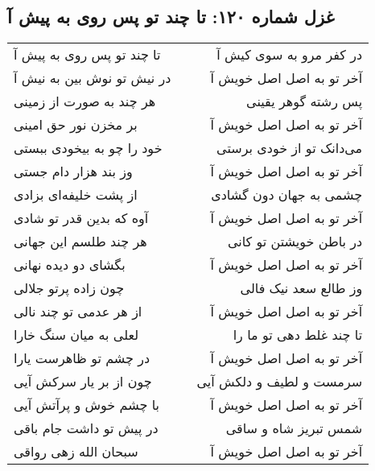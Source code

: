 \begin{center}
\section*{غزل شماره ۱۲۰: تا چند تو پس روی به پیش آ}
\label{sec:0120}
\begin{longtable}{l p{0.5cm} r}
تا چند تو پس روی به پیش آ
&&
در کفر مرو به سوی کیش آ
\\
در نیش تو نوش بین به نیش آ
&&
آخر تو به اصل اصل خویش آ
\\
هر چند به صورت از زمینی
&&
پس رشته گوهر یقینی
\\
بر مخزن نور حق امینی
&&
آخر تو به اصل اصل خویش آ
\\
خود را چو به بیخودی ببستی
&&
می‌دانک تو از خودی برستی
\\
وز بند هزار دام جستی
&&
آخر تو به اصل اصل خویش آ
\\
از پشت خلیفه‌ای بزادی
&&
چشمی به جهان دون گشادی
\\
آوه که بدین قدر تو شادی
&&
آخر تو به اصل اصل خویش آ
\\
هر چند طلسم این جهانی
&&
در باطن خویشتن تو کانی
\\
بگشای دو دیده نهانی
&&
آخر تو به اصل اصل خویش آ
\\
چون زاده پرتو جلالی
&&
وز طالع سعد نیک فالی
\\
از هر عدمی تو چند نالی
&&
آخر تو به اصل اصل خویش آ
\\
لعلی به میان سنگ خارا
&&
تا چند غلط دهی تو ما را
\\
در چشم تو ظاهرست یارا
&&
آخر تو به اصل اصل خویش آ
\\
چون از بر یار سرکش آیی
&&
سرمست و لطیف و دلکش آیی
\\
با چشم خوش و پرآتش آیی
&&
آخر تو به اصل اصل خویش آ
\\
در پیش تو داشت جام باقی
&&
شمس تبریز شاه و ساقی
\\
سبحان الله زهی رواقی
&&
آخر تو به اصل اصل خویش آ
\\
\end{longtable}
\end{center}
